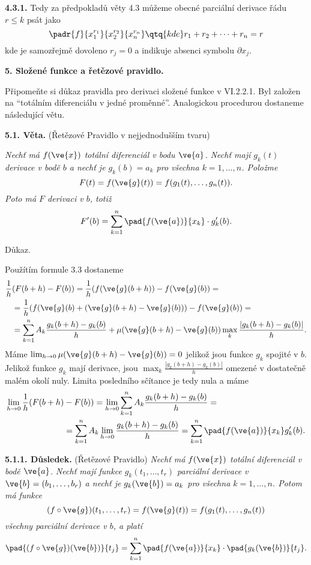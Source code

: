 \documentclass[12pt]{article}
\begin{document}
{{\bf 4.3.1.} Tedy za předpokladů věty 4.3 můžeme obecné parciální derivace
řádu $r\leq k$ psát jako
$$
\padr{f}{x_1^{r_1}}{x_2^{r_2}}{x_n^{r_n}}\qtq{kde} r_1+r_2+\cdots+r_n=r
$$
kde je samozřejmě dovoleno $r_j=0$ a indikuje absenci symbolu $\partial x_j$.



\vskip10mm
 
  
 {\large\bf 5. Složené funkce a řetězové pravidlo.}
 
 \bigskip
 
Připomeňte si důkaz pravidla pro derivaci složené funkce v VI.2.2.1.
Byl založen na ``totálním diferenciálu v jedné proměnné''. Analogickou procedurou dostaneme následující větu.

\medskip


{\bf 5.1. Věta.} (Řetězové Pravidlo v nejjednodušším tvaru) {\em Nechť má $f(\ve{x})$ totální diferenciál v bodu $\ve{a}$. 
Nechť mají $g_k(t)$ derivace v bodě $b$ 
a nechť je $g_k(b)=a_k$ pro všechna $k=1,\dots,n$. Položme
$$
F(t)=f(\ve{g}(t))=f(g_1(t),\dots,g_n(t)).
$$
Poto má $F$ derivaci v  $b$, totiž
$$
F'(b)=\sum_{k=1}^n\pad{f(\ve{a})}{x_k}\cdot g'_k(b).
$$

Důkaz.} Použítím formule  3.3 
dostaneme
$$ \begin{aligned}
\frac1h&(F(b+h)-F(b))=\frac1h(f(\ve{g}(b+h))-f(\ve{g}(b))=\\
&=\frac1h(f(\ve{g}(b)+(\ve{g}(b+h)-\ve{g}(b)))-f(\ve{g}(b))=\\
&=\sum_{k=1}^nA_k\frac{g_k(b+h)-g_k(b)}{h}+ \mu(\ve{g}(b+h)-\ve{g}(b))\max_k\frac{|g_k(b+h)-g_k(b)|}{h}.
\end{aligned}
$$
Máme $\lim_{h\to 0}\mu(\ve{g}(b+h)-\ve{g}(b))=0$ jelikož jsou funkce $g_k$ spojité v $b$. Jelikož funkce $g_k$ mají derivace, jsou
$\max_k\frac{|g_k(b+h)-g_k(b)|}{h}$  omezené v dostatečně malém okolí nuly. Limita posledního sčítance je tedy nula a máme
$$
\begin{aligned}
\lim_{h\to 0}\frac1h(F(b+h)&-F(b))
=\lim_{h\to 0}\sum_{k=1}^nA_k\frac{g_k(b+h)-g_k(b)}{h}=\\
&=\sum_{k=1}^nA_k\lim_{h\to 0}\frac{g_k(b+h)-g_k(b)}{h}=\sum_{k=1}^n \pad{f(\ve{a})}{x_k}g'_k(b).
\end{aligned}
$$
\sq

\bigskip

{\bf 5.1.1. Důsledek.} (Řetězové Pravidlo)  {\em Nechť má $f(\ve{x})$ totální diferenciál v bodě $\ve{a}$. 
Nechť mají funkce $g_k(t_1,\dots,t_r)$ parciální derivace 
v $\ve{b}=(b_1,\dots,b_r)$ a nechť je $g_k(\ve{b})=a_k$ pro všechna $k=1,\dots,n$. Potom má funkce
$$
(f\circ \ve{g})(t_1,\dots,t_r)=f(\ve{g}(t))=f(g_1(t),\dots,g_n(t))
$$
všechny parciální derivace v $b$, a platí
$$
\pad{(f\circ\ve{g})(\ve{b})}{t_j}=\sum_{k=1}^n\pad{f(\ve{a})}{x_k}\cdot \pad{g_k(\ve{b})}{t_j}.
$$
}

}
\end{document}
